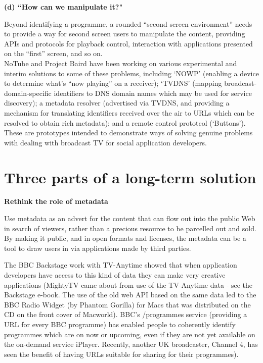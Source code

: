 \documentclass[]{article}%
\begin{document}
{\bf{(d) ``How can we manipulate it?"}}

Beyond identifying a programme, a rounded ``second screen environment'' needs to provide a way for second screen users to manipulate the content, providing APIs and protocols for playback control, interaction with applications presented on the ``first'' screen, and so on.
\\

NoTube and Project Baird have been working on various experimental and interim solutions to some of these problems, including  `NOWP' (enabling a device to determine what's ``now playing'' on a receiver);  `TVDNS' (mapping broadcast-domain-specific identifiers to DNS domain names which may be used for service discovery); a metadata resolver (advertised via TVDNS, and providing a mechanism for translating identifiers received over the air to URLs which can be resolved to obtain rich metadata); and a remote control prototcol (`Buttons'). These are prototypes intended to demonstrate ways of solving genuine problems with dealing with broadcast TV for social application developers. 

\section{Three parts of a long-term solution}

{\bf{Rethink the role of metadata}}

Use metadata as an advert for the content that can flow out into the public Web in search of viewers, rather than a precious resource to be parcelled out and sold. By making it public, and in open formats and licenses, the metadata can be a tool to draw users in via applications made by third parties.

The BBC Backstage work with TV-Anytime showed that when application developers have access to this kind of data they can make very creative applications (MightyTV came about from use of the TV-Anytime data - see the Backstage e-book.  The use of the old web API based on the same data led to the BBC Radio Widget (by Phantom Gorilla) for Macs that was distributed on the CD on the front cover of Macworld). BBC's /programmes service (providing a URL for every BBC programme) has enabled people to coherently identify programmes which are on now or upcoming, even if they are not yet available on the on-demand service iPlayer. Recently, another UK broadcaster, Channel 4, has seen the benefit of having URLs suitable for sharing for their programmes).
\\
\end{document}
